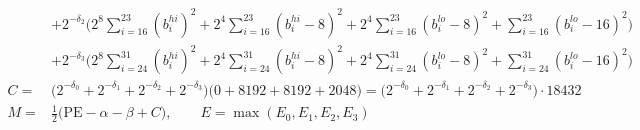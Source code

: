 \documentclass[fleqn]{article}
\begin{document}
{\[{\begin{aligned}
  & + 2^{-\delta_2}\Big(2^{8}\!\sum_{i=16}^{23}(b_i^{hi})^2 + 2^{4}\!\sum_{i=16}^{23}(b_i^{hi}{-}8)^2 + 2^{4}\!\sum_{i=16}^{23}(b_i^{lo}{-}8)^2 + \sum_{i=16}^{23}(b_i^{lo}{-}16)^2\Big) \\
  & + 2^{-\delta_3}\Big(2^{8}\!\sum_{i=24}^{31}(b_i^{hi})^2 + 2^{4}\!\sum_{i=24}^{31}(b_i^{hi}{-}8)^2 + 2^{4}\!\sum_{i=24}^{31}(b_i^{lo}{-}8)^2 + \sum_{i=24}^{31}(b_i^{lo}{-}16)^2\Big) \\[0.3em]
C ={}& \big(2^{-\delta_0} + 2^{-\delta_1} + 2^{-\delta_2} + 2^{-\delta_3}\big)\big(0 + 8192 + 8192 + 2048\big) = \big(2^{-\delta_0} + 2^{-\delta_1} + 2^{-\delta_2} + 2^{-\delta_3}\big)\cdot 18432 \\[0.3em]
M ={}& \tfrac12\big(\mathrm{PE} - \alpha - \beta + C\big), \qquad E = \max(E_0,E_1,E_2,E_3)
\end{aligned}
\;}
\]
}
\end{document}
